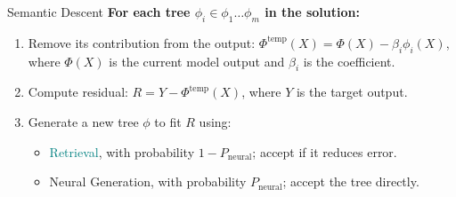 \documentclass[final]{beamer}
\newcommand{\hlblue}[1]{\textcolor{mainblue}{#1}}
\newcommand{\hlpurple}[1]{\textcolor{deepplum}{#1}}
\newcommand{\hlteal}[1]{\textcolor{teal}{#1}}
\newlength{\onecolwid}
\begin{document}
\begin{frame}[t]
\begin{columns}[t]
\begin{column}{\onecolwid}


                \begin{block}{Semantic Descent}
                    \textbf{\hlblue{For each tree $\phi_i \in \phi_1 \dots \phi_m$ in the solution:}}
                    \begin{enumerate}
                        \item Remove its contribution from the output: $\Phi^{\text{temp}}(X) = \Phi(X) - \beta_i \phi_i(X)$, where $\Phi(X)$ is the current model output and $\beta_i$ is the coefficient.
                        \item Compute residual: $R = Y - \Phi^{\text{temp}}(X)$, where $Y$ is the target output.
                        \item Generate a new tree $\phi$ to fit $R$ using:
                        \begin{itemize}
                            \normalsize
                            \item \hlteal{Retrieval}, with probability $1 - P_{\text{neural}}$; accept if it reduces error.
                            \item \hlpurple{Neural Generation}, with probability $P_{\text{neural}}$; accept the tree directly.
                        \end{itemize}
                    \end{enumerate}
                \end{block}
                \hfill
                \vspace{-2.5cm}



\end{column}
\end{columns}
\end{frame}
\end{document}
